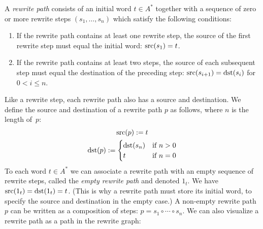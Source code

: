 \documentclass[../generics]{subfiles}
\begin{document}
\begin{definition}
A \emph{rewrite path} consists of an initial word $t\in A^*$ together with a sequence of zero or more rewrite steps $(s_1,\ldots,s_n)$ which satisfy the following conditions:
\begin{enumerate}
\item If the rewrite path contains at least one rewrite step, the source of the first rewrite step must equal the initial word: $\operatorname{src}(s_1)=t$.
\item If the rewrite path contains at least two steps, the source of each subsequent step must equal the destination of the preceding step: $\operatorname{src}(s_{i+1})=\operatorname{dst}(s_i)$ for $0<i\leq n$.
\end{enumerate}
Like a rewrite step, each rewrite path also has a source and destination. We define the source and destination of a rewrite path $p$ as follows, where $n$ is the length of~$p$:
\begin{gather*}
\operatorname{src}(p):=t\\
\operatorname{dst}(p):=\begin{cases}
\operatorname{dst}(s_n)&\text{if $n>0$}\\
t&\text{if $n=0$}
\end{cases}
\end{gather*}
To each word $t\in A^*$ we can associate a rewrite path with an empty sequence of rewrite steps, called the \emph{empty rewrite path} and denoted $1_t$. We have $\operatorname{src}(1_t)=\operatorname{dst}(1_t)=t$. (This is why a rewrite path must store its initial word, to specify the source and destination in the empty case.) A non-empty rewrite path $p$ can be written as a composition of steps: $p=s_1\circ\cdots\circ s_n$. We can also visualize a rewrite path as a path in the rewrite graph:

\begin{center}
\end{center}
\end{definition}

\newcommand{\BRule}{(ab\Red\varepsilon)}
\newcommand{\BRuleInv}{(\varepsilon\Red ab)}
\end{document}
